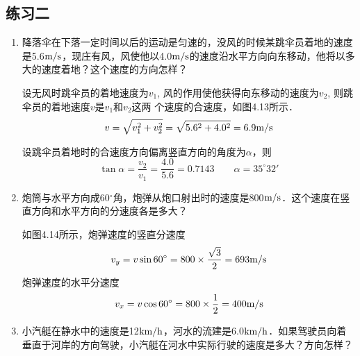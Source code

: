 \subsection{练习二}
\begin{enumerate}
	\item 降落伞在下落一定时间以后的运动是匀速的，没风的时候某跳伞员着地的速度是5.6$\text{m}/\text{s}$，现庄有风，风使他以4.0$\text{m}/\text{s}$的速度沿水平方向向东移动，他将以多大的速度着地？这个速度的方向怎样？

    \begin{solution}
        设无风时跳伞员的着地速度为$v_1$, 风的作用使他获得向东移动的速度为$v_2$, 则跳伞员的着地速度$v$是$v_1$和$v_2$这两
        个速度的合速度，如图4.13所示．
\[v=\sqrt{v^2_1+v^2_2}=\sqrt{5.6^2+4.0^2}=6.9\text{m}/\text{s}\]

        设跳伞员着地时的合速度方向偏离竖直方向的角度为$\alpha$，则
\[\tan\alpha=\frac{v_2}{v_1}=\frac{4.0}{5.6}=0.7143\qquad \alpha=35^{\circ}32'\]
    \end{solution}

\begin{figure}[htp]\centering
    \begin{minipage}[t]{0.48\textwidth}
    \centering
{}
    \caption{}
    \end{minipage}
    \begin{minipage}[t]{0.48\textwidth}
    \centering
    \caption{}
    \end{minipage}
    \end{figure}

\item 炮筒与水平方向成60$^\circ$角，炮弹从炮口射出时的速度是800$\text{m}/\text{s}$．这个速度在竖直方向和水平方向的分速度各是多大？

\begin{solution}
    如图4.14所示，炮弹速度的竖直分速度
\[v_y=v\sin 60^{\circ}=800\times \frac{\sqrt{3}}{2}=693\text{m}/\text{s}\]
炮弹速度的水平分速度
\[v_x=v\cos60^{\circ}=800\times\frac{1}{2}=400\text{m}/\text{s}\]
\end{solution}
\item 小汽艇在静水中的速度是12$\text{km}/\text{h}$，河水的流建是6.0$\text{km}/\text{h}$．如果驾驶员向着垂直于河岸的方向驾驶，小汽艇在河水中实际行驶的速度是多大？方向怎样？


\end{enumerate}
